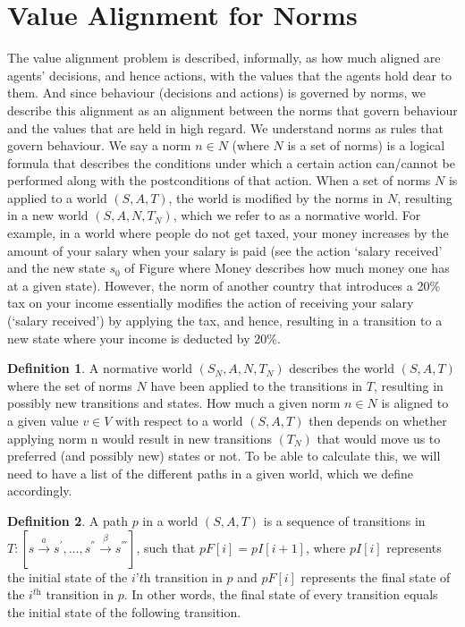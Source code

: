 \documentclass{article}
\theoremstyle{definition}
\newtheorem{definition}{Definition}
\theoremstyle{remark}
\begin{document}
\section*{Value Alignment for Norms}
The value alignment problem is described, informally, as how much aligned are agents’ decisions, and hence actions, with the values that the agents hold dear to them. And since behaviour (decisions and actions) is governed by norms, we describe this alignment as an alignment between the norms that govern behaviour and the values that are held in high regard.
We understand norms as rules that govern behaviour. We say a norm $n \in N$ (where $N$ is a set of norms) is a logical formula that describes the conditions under which a certain action can/cannot be performed along with the postconditions of that action. When a set of norms $N$ is applied to a world $(S, A, T)$, the world is modified by the norms in $N$, resulting in a new world 
$(S, A, N, T_N )$, which we refer to as a normative world. For example, in a world where people do not get taxed, your money increases by the amount of your salary when your salary is paid (see the action ‘salary received’ and the new state $s_0$ of Figure  where Money describes how much money one has at a given state). However, the norm of another country that introduces a 20\% tax on your income essentially modifies the action of receiving your salary (‘salary received’) by applying the tax, and hence, resulting in a transition to a new state where your income is
deducted by 20\%.
\begin{definition}
A normative world $(S_N , A, N, T_N )$ describes the world $(S, A, T)$
where the set of norms $N$ have been applied to the transitions in $T$, resulting in
possibly new transitions and states.
How much a given norm $n \in N$ is aligned to a given value $v \in V$ with respect
to a world $(S, A, T)$ then depends on whether applying norm n would result in
new transitions $(T_N )$ that would move us to preferred (and possibly new) states
or not. To be able to calculate this, we will need to have a list of the different
paths in a given world, which we define accordingly.
\end{definition}

\begin{definition}
A path $p$ in a world $(S, A, T)$ is a sequence of transitions in $T: [s \xrightarrow{a} s^', \dots, s^{''} \xrightarrow{\beta} s^{'''}]$, such that $pF [i] = pI [i + 1]$, where $pI [i]$ represents the initial state of the $i’\textit{th}$ transition in $p$ and $pF [i]$ represents the final state of the
$i^\textit{th}$ transition in $p$. In other words, the final state of every transition equals the initial state of the following transition.
\end{definition}
\end{document}
